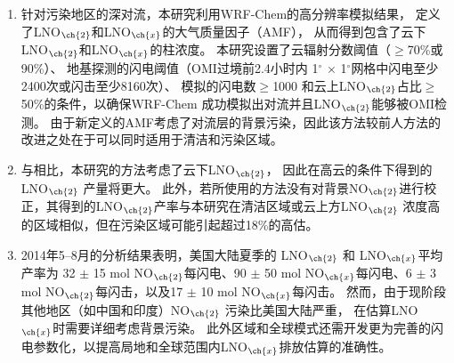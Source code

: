 \begin{enumerate}[label=（\arabic*）, labelindent=\parindent, nosep, leftmargin=0pt, widest=0, itemindent=*, topsep=0pt, partopsep=0pt, parsep=0pt]

\item 针对污染地区的深对流，本研究利用WRF-Chem的高分辨率模拟结果，
定义了LNO$_{\ch{2}}$和LNO$_{\ch{x}}$的大气质量因子（AMF），
从而得到包含了云下LNO$_{\ch{2}}$和LNO$_{\ch{x}}$的柱浓度。
本研究设置了云辐射分数阈值（$\geq$70\%或90\%）、
地基探测的闪电阈值（OMI过境前2.4小时内 1$^{\circ}$ $\times$ 1$^{\circ}$网格中闪电至少2400次或闪击至少8160次）、
模拟的闪电数$\geq$1000 和云上LNO$_{\ch{2}}$占比$\geq$50\%的条件，以确保WRF-Chem 成功模拟出对流并且LNO$_{\ch{2}}$能够被OMI检测。
由于新定义的AMF考虑了对流层的背景污染，因此该方法较前人方法的改进之处在于可以同时适用于清洁和污染区域。

\item 与\citet{Lapierre.2020}相比，本研究的方法考虑了云下LNO$_{\ch{2}}$，
因此在高云的条件下得到的LNO$_{\ch{2}}$ 产量将更大。
此外，若\citet{Pickering.2016}所使用的方法没有对背景NO$_{\ch{2}}$进行校正，其得到的LNO$_{\ch{2}}$产率与本研究在清洁区域或云上方LNO$_{\ch{2}}$ 浓度高的区域相似，但在污染区域可能引起超过18\%的高估。

\item 2014年5--8月的分析结果表明，美国大陆夏季的 LNO$_{\ch{2}}$ 和 LNO$_{\ch{x}}$平均产率为
32 $\pm$ 15 mol NO$_{\ch{2}}$每闪电、90 $\pm$ 50 mol NO$_{\ch{x}}$每闪电、6 $\pm$ 3 mol NO$_{\ch{2}}$每闪击，以及17 $\pm$ 10 mol NO$_{\ch{x}}$每闪击。
然而，由于现阶段其他地区（如中国和印度）NO$_{\ch{2}}$ 污染比美国大陆严重，
在估算LNO$_{\ch{x}}$时需要详细考虑背景污染。
此外区域和全球模式还需开发更为完善的闪电参数化，以提高局地和全球范围内LNO$_{\ch{x}}$排放估算的准确性。

\end{enumerate}
